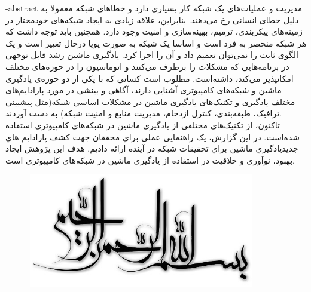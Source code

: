 \department{}

\fa-abstract{
مدیریت و عملیات‌های یک شبکه کار بسیاری دارد و خطا‌های شبکه معمولا به دلیل خطای انسانی رخ می‌دهند. بنابراین، علاقه زیادی به ایجاد شبکه‌های خودمختار در زمینه‌های پیکربندی، ترمیم، بهینه‌سازی و امنیت وجود دارد. همچنین باید توجه داشت که هر شبکه منحصر به فرد است و اساسا یک شبکه به صورت پویا درحال تغییر است و یک الگوی ثابت را نمی‌توان تعمیم داد و آن را اجرا کرد.
یادگیری ماشین رشد قابل توجهی در برنامه‌هایی که مشکلات را برطرف می‌کنند و اتوماسیون را در حوزه‌های مختلف امکانپذیر می‌کند، داشته‌است. مطلوب است کسانی که با یکی از دو حوزه‌ی یادگیری ماشین و شبکه‌های کامپیوتری آشنایی دارند، آگاهی و بینشی در مورد پارادایم‌های مختلف یادگیری و تکنیک‌های یادگیری ماشین در مشکلات اساسی شبکه(مثل پیشبینی ترافیک، طبقه‌بندی، کنترل ازدحام، مدیریت منابع و امنیت شبکه) به دست آوردند.
\\
تاکنون، از تکنیک‌های مختلفی از یادگیری ماشین در شبکه‌های کامپیوتری استفاده شده‌است.
در این گزارش، یک راهنمایی عملی براي محققان جهت کشف پارادایم هاي جدیدیادگیري ماشین براي تحقیقات شبکه در آینده ارائه دادیم.  
هدف این پژوهش ایجاد بهبود، نوآوری و خلاقیت در استفاده از یادگیری ماشین در شبکه‌های کامپیوتری است.
}





\AUTtitle
\vspace*{7cm}
\thispagestyle{empty}
\begin{center}
\includegraphics[height=5cm,width=12cm]{besm}
\end{center}